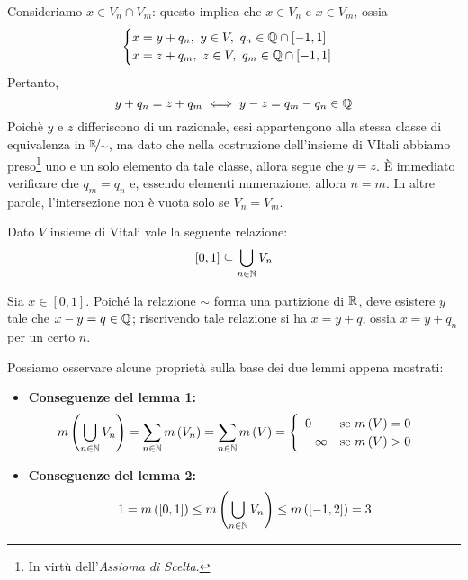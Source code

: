 \begin{demonstration}
	Consideriamo $x\in V_n\cap V_m$: questo implica che $x\in V_n$ e $x\in V_m$, ossia
	\begin{equation*}
		\begin{cases}
			x=y+q_n,\ y\in V,\ q_n\in\mathbb{Q}\cap\left[-1,1\right]\\
			x=z+q_m,\ z\in V,\ q_m\in\mathbb{Q}\cap\left[-1,1\right]
		\end{cases}
	\end{equation*}
	Pertanto,
	\begin{equation*}
		y+q_n=z+q_m\iff y-z=q_m-q_n\in\mathbb{Q}
	\end{equation*}
	Poichè $y$ e $z$ differiscono di un razionale, essi appartengono alla stessa classe di equivalenza in $\nicefrac{\mathbb{R}}{\sim}$, ma dato che nella costruzione dell'insieme di VItali abbiamo preso\footnote{In virtù dell'\textit{Assioma di Scelta}.} uno e un solo elemento da tale classe, allora segue che $y=z$. È immediato verificare che $q_m=q_n$ e, essendo elementi numerazione, allora $n=m$. In altre parole, l'intersezione non è vuota solo se $V_n=V_m$.
\end{demonstration}
\begin{lemming}
	Dato $V$ insieme di Vitali vale la seguente relazione:
	\begin{equation*}
		\left[0,1\right]\subseteq\bigcup_{n\in\mathbb{N}}V_n
	\end{equation*}
\end{lemming}
\begin{demonstration}
	Sia $x\in\left[0,1\right]$. Poiché la relazione $\sim$ forma una partizione di $\mathbb{R}$, deve esistere $y$ tale che $x-y=q\in\mathbb{Q}$; riscrivendo tale relazione si ha $x=y+q$, ossia $x=y+q_n$ per un certo $n$.
\end{demonstration}
Possiamo osservare alcune proprietà sulla base dei due lemmi appena mostrati:
\begin{itemize}
	\item \textbf{Conseguenze del lemma 1:}
	\begin{equation*}
		m\left(\bigcup_{n\in\mathbb{N}}V_n\right)=\sum_{n\in\mathbb{N}}m\left(V_n\right)=\sum_{n\in\mathbb{N}}m\left(V\right)=\begin{cases}
			\begin{array}{ll}
				0&\text{se }m\left(V\right)=0\\
				+\infty&\text{se }m\left(V\right)>0
			\end{array}
		\end{cases}
	\end{equation*}
	\item \textbf{Conseguenze del lemma 2:}
	\begin{equation*}
		1=m\left(\left[0,1\right]\right)\leq m\left(\bigcup_{n\in\mathbb{N}}V_n\right)\leq m\left(\left[-1,2\right]\right)=3
	\end{equation*}
\end{itemize}
